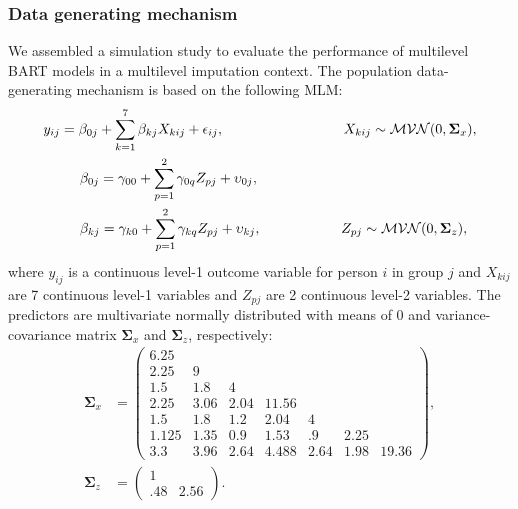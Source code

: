 \documentclass[10pt, a4paper, titlepage]{article}
\begin{document}
\subsubsection{Data generating mechanism}
We assembled a simulation study to evaluate the performance of multilevel BART models in a multilevel imputation context. The population data-generating mechanism is based on the following MLM:
\begin{subequations}
\label{eq:population}
\begin{align}
        y_{ij} &= \beta_{0j} + \sum_{k=1}^{7}\beta_{kj}X_{kij} + \epsilon_{ij}, \hspace{3cm} X_{kij} \sim \mathcal{MVN}(0, \boldsymbol{\Sigma}_{x}), \label{eq:population1} \\
        &\hspace{.5cm}\beta_{0j} = \gamma_{00} + \sum_{p=1}^{2}\gamma_{0q}Z_{pj} + \upsilon_{0j}, \label{eq:beta0}\\
        &\hspace{.5cm}\beta_{kj} = \gamma_{k0} + \sum_{p=1}^{2}\gamma_{kq}Z_{pj} + \upsilon_{kj}, \hspace{2cm} Z_{pj} \sim \mathcal{MVN}(0, \boldsymbol{\Sigma}_{z}), \label{eq:betak}
\end{align}
\end{subequations} where $y_{ij}$ is a continuous level-1 outcome variable for person $i$ in group $j$ and $X_{kij}$ are 7 continuous level-1 variables and $Z_{pj}$ are 2 continuous level-2 variables. The predictors are multivariate normally distributed with means of 0 and variance-covariance matrix $\boldsymbol{\Sigma}_{x}$ and $\boldsymbol{\Sigma}_{z}$, respectively:
\begin{subequations}
\begin{align}
    \boldsymbol{\Sigma}_{x} &= \begin{pmatrix}
        6.25& & & & & & \\
        2.25& 9& & & & & \\
        1.5& 1.8& 4& & & & \\
        2.25& 3.06& 2.04& 11.56& & & \\
        1.5& 1.8& 1.2& 2.04& 4& & \\
        1.125& 1.35& 0.9& 1.53& .9& 2.25& \\
        3.3& 3.96& 2.64& 4.488& 2.64& 1.98& 19.36
    \end{pmatrix}, \label{eq:sigma.x} \\
    \boldsymbol{\Sigma}_{z} &= \begin{pmatrix}
        1& \\
        .48& 2.56
    \end{pmatrix}. \label{eq:sigma.z}
\end{align}
\end{subequations}
\end{document}
